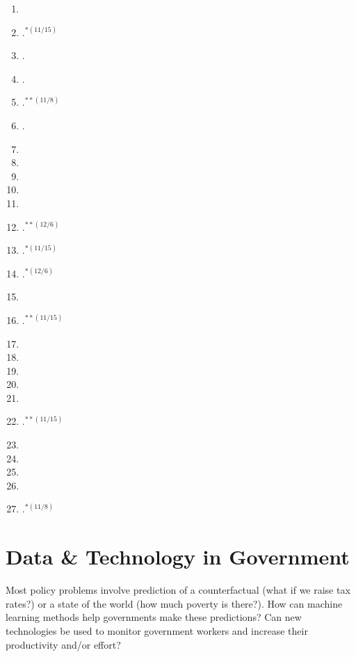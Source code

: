 \documentclass[11pt]{article}
\begin{document}
\begin{enumerate}
\item {}
\item {}.$^{*(11/15)}$
\item {}.
\item {}.
\item \textbf{}.$^{**(11/8)}$
\item {}.
\item {}
\item {}
\item {}
\item {}
\item {}
\item \textbf{}.$^{**(12/6)}$
\item {}.$^{*(11/15)}$
\item {}.$^{*(12/6)}$
\item {}
\item \textbf{}.$^{**(11/15)}$
\item {}
\item {}
\item {}
\item {}
\item {}
\item \textbf{}.$^{**(11/15)}$
\item {}
\item {}
\item {}
\item {}
\item {}.$^{*(11/8)}$
\end{enumerate}

\section{Data \& Technology in Government}
Most policy problems involve prediction of a counterfactual (what if we raise tax rates?) or a state of the world (how much poverty is there?). How can machine learning methods help governments make these predictions? Can new technologies be used to monitor government workers and increase their productivity and/or effort?
\end{document}
